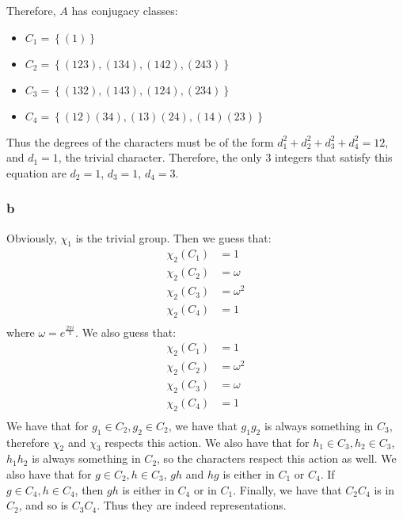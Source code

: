 \documentclass[]{article}
\begin{document}
Therefore, $A$ has conjugacy classes:
\begin{itemize}
	\item $C_1 = \left\lbrace (1)\right\rbrace $
	\item $C_2 = \left\lbrace (123), (134), (142), (243)\right\rbrace $
	\item $C_3 = \left\lbrace (132), (143), (124), (234)\right\rbrace $
	\item $C_4 = \left\lbrace (12)(34), (13)(24), (14)(23)\right\rbrace $
\end{itemize}
Thus the degrees of the characters must be of the form $d_1^2 + d_2^2 + d_3^2 + d_4^2 = 12$, and $d_1 = 1$, the trivial character. Therefore, the only 3 integers that satisfy this equation are $d_2 = 1$, $d_3 = 1$, $d_4 = 3$. 
\subsubsection*{b}
Obviously, $\chi_1$ is the trivial group. Then we guess that:
\begin{align*}
	\chi_2(C_1) &= 1\\
	\chi_2(C_2) &= \omega\\
	\chi_2(C_3) &= \omega^2\\
	\chi_2(C_4) &= 1\\
\end{align*}
where $\omega = e^{\frac{2 \pi i}{3}}$.
We also guess that:
\begin{align*}
	\chi_2(C_1) &= 1\\
	\chi_2(C_2) &= \omega^2\\
	\chi_2(C_3) &= \omega\\
	\chi_2(C_4) &= 1\\
\end{align*}
We have that for $g_1 \in C_2, g_2 \in C_2$, we have that $g_1 g_2$ is always something in $C_3$, therefore $\chi_2$ and $\chi_3$ respects this action. We also have that for $h_1 \in C_3, h_2 \in C_3$, $h_1 h_2$ is always something in $C_2$, so the characters respect this action as well. We also have that for $g \in C_2, h \in C_3$, $gh$ and $hg$ is either in $C_1$ or $C_4$. If $g \in C_4, h \in C_4$, then $gh$ is either in $C_4$ or in $C_1$. Finally, we have that $C_2 C_4$ is in $C_2$, and so is $C_3 C_4$. Thus they are indeed representations. 
\end{document}
